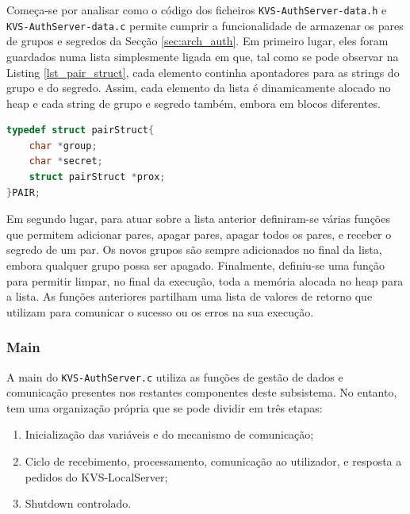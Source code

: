 Começa-se por analisar como o código dos ficheiros \texttt{KVS-AuthServer-data.h} e \linebreak \texttt{KVS-AuthServer-data.c} permite cumprir a funcionalidade de armazenar os pares de grupos e segredos da Secção \ref{sec:arch_auth}. Em primeiro lugar, eles foram guardados numa lista simplesmente ligada em que, tal como se pode observar na Listing \ref{lst_pair_struct}, cada elemento continha apontadores para as strings do grupo e do segredo. Assim, cada elemento da lista é dinamicamente alocado no heap e cada string de grupo e segredo também, embora em blocos diferentes.
\begin{lstlisting}[language=C,label={lst_pair_struct},caption=Estrutura \texttt{PAIR} no KVS-AuthServer-data.h.]
typedef struct pairStruct{
    char *group;
    char *secret;
    struct pairStruct *prox;
}PAIR;
\end{lstlisting}
Em segundo lugar, para atuar sobre a lista anterior definiram-se várias funções que permitem adicionar pares, apagar pares, apagar todos os pares, e receber o segredo de um par. Os novos grupos são sempre adicionados no final da lista, embora qualquer grupo possa ser apagado. Finalmente, definiu-se uma função para permitir limpar, no final da execução, toda a memória alocada no heap para a lista. As funções anteriores partilham uma lista de valores de retorno que utilizam para comunicar o sucesso ou os erros na sua execução.

\subsubsection{Main}

A main do \texttt{KVS-AuthServer.c} utiliza as funções de gestão de dados e comunicação presentes nos restantes componentes deste subsistema. No entanto, tem uma organização própria que se pode dividir em três etapas:
\begin{enumerate}[noitemsep]
    \item Inicialização das variáveis e do mecanismo de comunicação;
    \item Ciclo de recebimento, processamento, comunicação ao utilizador, e resposta a pedidos do KVS-LocalServer;
    \item Shutdown controlado.
\end{enumerate}



